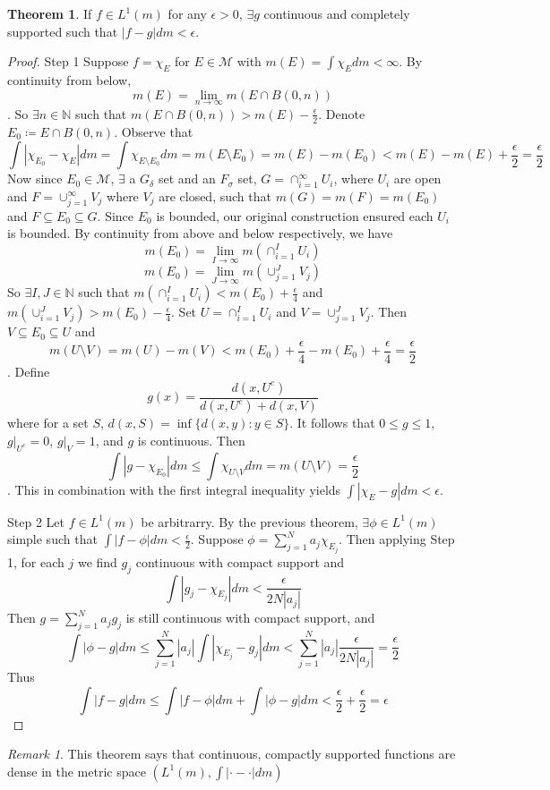 \documentclass{article}
\theoremstyle{definition}
\newtheorem{theorem}{Theorem}[section]
\theoremstyle{remark}
\newtheorem*{remark}{Remark}
\theoremstyle{remark}
\def\scriptm{{\mathcal M}}
\def\naturals{{\mathbb N}}
\begin{document}
\begin{theorem}
If $f\in L^1(m)$ for any $\epsilon > 0$, $\exists g$ continuous and completely supported such that $|f - g| dm < \epsilon$.
\end{theorem}
\begin{proof}
Step 1
Suppose $f = \chi_E$ for $E\in \scriptm$ with $m(E) = \int \chi_E dm < \infty$. By continuity from below,
$$m(E) = \lim_{n\to\infty} m(E \cap B(0, n))$$. So $\exists n\in \naturals$ such that $m(E\cap B(0, n)) > m(E) - \frac{\epsilon}{2}$. Denote $E_0 \coloneqq E \cap B(0, n)$. Observe that
$$\int | \chi_{E_0} - \chi_E | dm = \int \chi_{E\setminus E_0} dm = m(E \setminus E_0) = m(E) - m(E_0) < m(E) - m(E) + \frac{\epsilon}{2} = \frac{\epsilon}{2}$$
Now since $E_0 \in \scriptm$, $\exists$ a $G_\delta$ set and an $F_\sigma$ set, $G = \cap_{i=1}^\infty U_i$, where $U_i$ are open and $F = \cup_{j=1}^\infty V_j$ where $V_j$ are closed, such that $m(G) = m(F) = m(E_0)$ and $F \subseteq E_0 \subseteq G$. Since $E_0$ is bounded, our original construction ensured each $U_i$ is bounded. By continuity from above and below respectively, we have
$$m(E_0) = \lim_{I\to\infty} m(\cap_{i=1}^I U_i)$$
$$m(E_0) = \lim_{J\to\infty} m(\cup_{j=1}^J V_j)$$ So $\exists I, J \in\naturals$ such that $m(\cap_{i=1}^I U_i) < m(E_0) + \frac{\epsilon}{4}$ and $m(\cup_{i=1}^J V_j) > m(E_0) - \frac{\epsilon}{4}$. Set $U = \cap_{i=1}^I U_i$ and $V = \cup_{j=1}^J V_j$. Then $V \subseteq E_0 \subseteq U$ and
$$m(U\setminus V) = m(U) - m(V) < m(E_0) + \frac{\epsilon}{4} - m(E_0) + \frac{\epsilon}{4} = \frac{\epsilon}{2}$$. Define
$$g(x) = \frac{d(x, U^c)}{d(x, U^c) + d(x, V)}$$
 where for a set $S$, $d(x, S) = \inf\{d(x,y) : y\in S\}$. It follows that $0\leq g \leq 1$, $g|_{U^c} = 0$, $g|_V = 1$, and $g$ is continuous. Then
 $$\int |g - \chi_{E_0}| dm \leq \int \chi_{U\setminus V} dm = m(U\setminus V) = \frac{\epsilon}{2}$$. This in combination with the first integral inequality yields $\int |\chi_E - g| dm < \epsilon$.

Step 2
Let $f\in L^1(m)$ be arbitrarry. By the previous theorem, $\exists \phi \in L^1(m)$ simple such that $\int |f - \phi| dm < \frac{\epsilon}{2}$. Suppose $\phi = \sum_{j=1}^N a_j \chi_{E_j}$. Then applying Step 1, for each $j$ we find $g_j$ continuous with compact support and
$$\int | g_j - \chi_{E_j}| dm < \frac{\epsilon}{2N|a_j|}$$
 Then $g  = \sum_{j=1}^N a_j g_j$ is still continuous with compact support, and
 $$\int |\phi - g| dm \leq \sum_{j=1}^N |a_j| \int |\chi_{E_j} - g_j| dm < \sum_{j=1}^N |a_j| \frac{\epsilon}{2N|a_j|} = \frac{\epsilon}{2}$$
 Thus
 $$\int |f - g| dm \leq \int |f - \phi| dm + \int |\phi - g| dm < \frac{\epsilon}{2} + \frac{\epsilon}{2} = \epsilon$$
\end{proof}
\begin{remark}
This theorem says that continuous, compactly supported functions are dense in the metric space $(L^1(m), \int |\cdot - \cdot| dm)$
\end{remark}
\end{document}
